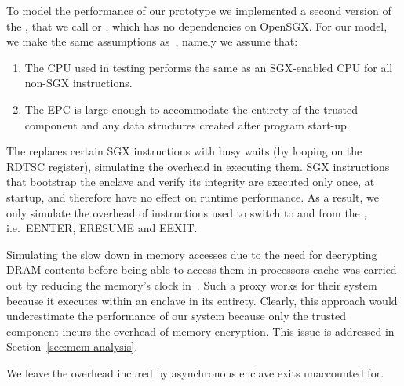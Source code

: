 \documentclass[../../../main.tex]{subfiles}
\begin{document}
\label{sec:perfmodel}
To model the performance of our prototype we implemented a second version of
the \enclaveprogram, that we call \busywait or \enclavemodel, which
has no dependencies on OpenSGX. For our model, we make the same assumptions
as~\cite{Baumann14}, namely we assume that:
\begin{enumerate}
  \item The CPU used in testing performs the same as an SGX-enabled CPU for
    all non-SGX instructions.
  \item The EPC is large enough to accommodate the entirety of the trusted
    component and any data structures created after program start-up.
\end{enumerate}

The \busywait replaces certain SGX instructions with busy waits (by looping on the RDTSC register), simulating the overhead in executing them. SGX instructions that bootstrap the enclave and verify its integrity are executed only once, at startup, and therefore have no effect on runtime performance. As a result, we only simulate the overhead of instructions used to switch to and from the \enclaveprogram, i.e.\ EENTER, ERESUME and EEXIT.

Simulating the slow down in memory accesses due to the need for decrypting
DRAM contents before being able to access them in processors cache was carried
out by reducing the memory's clock in~\cite{Baumann14}. Such a proxy works for
their system because it executes within an enclave in its entirety. Clearly,
this approach would underestimate the performance of our system because only
the trusted component incurs the overhead of memory encryption. This issue is
addressed in Section~\ref{sec:mem-analysis}.

We leave the overhead incured by asynchronous enclave exits unaccounted for.
\end{document}
